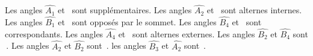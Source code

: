%
%
    \parbox{.3\linewidth}{}
    \parbox{.7\linewidth}{%
        \begin{tasks}
            \task Les angles $\widehat{A_1}$ et \dotfill\ sont supplémentaires.
            \task Les angles $\widehat{A_2}$ et \dotfill\ sont alternes internes.
            \task Les angles $\widehat{B_1}$ et \dotfill\ sont opposés par le sommet.
            \task Les angles $\widehat{B_4}$ et \dotfill\ sont correspondants.
            \task Les angles $\widehat{A_4}$ et \dotfill\ sont alternes externes.
            \task Les angles $\widehat{B_2}$ et $\widehat{B_4}$ sont \dotfill\,.
            \task Les angles $\widehat{A_2}$ et $\widehat{B_2}$ sont \dotfill\,.
            \task les angles $\widehat{B_3}$ et $\widehat{A_2}$ sont \dotfill\,.
        \end{tasks}}
